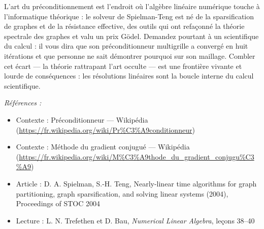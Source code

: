 \documentclass[11pt]{article}
\newenvironment{refs}{\par\small\noindent\emph{Références :}\begin{itemize}\setlength\itemsep{0pt}}{\end{itemize}\normalsize}
\begin{document}
\noindent \og{} L'art du préconditionnement \fg{} est l'endroit où l'algèbre linéaire
numérique touche à l'informatique théorique : le solveur de Spielman-Teng est né de la
sparsification de graphes et de la résistance effective, des outils qui ont refaçonné la
théorie spectrale des graphes et valu un prix Gödel. Demandez pourtant à un scientifique
du calcul : il vous dira que son préconditionneur multigrille a convergé en huit
itérations et que personne ne sait démontrer pourquoi sur son maillage. Combler cet
écart --- la théorie rattrapant l'art occulte --- est une frontière vivante et lourde de
conséquences : les résolutions linéaires sont la boucle interne du calcul
scientifique.

\begin{refs}
\item Contexte : Préconditionneur --- Wikipédia (\url{https://fr.wikipedia.org/wiki/Pr%C3%A9conditionneur})
\item Contexte : Méthode du gradient conjugué --- Wikipédia (\url{https://fr.wikipedia.org/wiki/M%C3%A9thode_du_gradient_conjugu%C3%A9})
\item Article : D. A. Spielman, S.-H. Teng, \og{} Nearly-linear time algorithms for graph partitioning, graph sparsification, and solving linear systems \fg{} (2004), Proceedings of STOC 2004
\item Lecture : L. N. Trefethen et D. Bau, \textit{Numerical Linear Algebra}, leçons 38--40
\end{refs}

\bigskip
\end{document}
